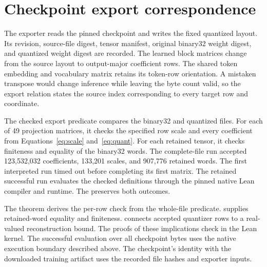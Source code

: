 \section{Checkpoint export correspondence}
\label{sec:export}

The exporter reads the pinned  checkpoint and writes the fixed quantized layout.  Its revision, source-file digest, tensor manifest, original binary32 weight digest, and quantized weight digest are recorded.  The learned block matrices change from the source layout to output-major coefficient rows.  The shared token embedding and vocabulary matrix retains its token-row orientation.  A mistaken transpose would change inference while leaving the byte count valid, so the export relation states the source index corresponding to every target row and coordinate.

The checked export predicate compares the binary32 and quantized files.  For each of 49 projection matrices, it checks the specified row scale and every coefficient from Equations~\eqref{eq:scale} and~\eqref{eq:quant}.  For each retained tensor, it checks finiteness and equality of the binary32 words.  The complete-file run accepted 123,532,032 coefficients, 133,201 scales, and 907,776 retained words.  The first interpreted run timed out before completing its first matrix.  The retained successful run evaluates the checked definitions through the pinned native Lean compiler and runtime.  The  preserves both outcomes.

The theorem  derives the per-row check from the whole-file predicate.   supplies retained-word equality and finiteness.   connects accepted quantizer rows to a real-valued reconstruction bound.  The proofs of these implications check in the Lean kernel.  The successful evaluation over all checkpoint bytes uses the native execution boundary described above.  The checkpoint's identity with the downloaded training artifact uses the recorded file hashes and exporter inputs.

